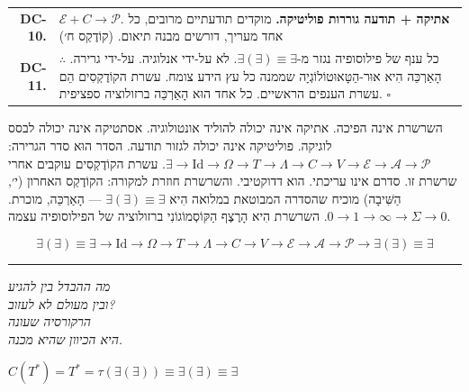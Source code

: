 \documentclass[10pt, openany, oneside]{book}
\begin{document}
{\begin{tabular}{r p{}}
\textbf{DC-10.} & $\mathcal{E} + C \to \mathcal{P}$. \textbf{אתיקה + תודעה גוררות פוליטיקה.} מוקדים תודעתיים מרובים, כל אחד מעריך, דורשים מבנה תיאום. (קוֹדֶקְס ח׳) \\[0.3em]
\textbf{DC-11.} & $\therefore$ כל ענף של פילוסופיה נגזר מ-$\exists(\exists) \equiv \exists$. לא על-ידי אנלוגיה. על-ידי גרירה. הָאַרְכֵּה הִיא אוּר-הַטָּאוּטוֹלוֹגְיָה שממנה כל עץ הידע צומח. עשרת הקוֹדֶקְסִים הֵם עשרת הענפים הראשיים. כל אחד הוּא הָאַרְכֵּה ברזולוציה ספציפית. $\square$ \\[0.3em]
\end{tabular}
}

\vspace{0.8em}

\noindent השרשרת אינה הפיכה. אתיקה אינה יכולה להוליד אונטולוגיה. אסתטיקה אינה יכולה לבסס לוגיקה. פוליטיקה אינה יכולה לגזור תודעה. הסדר הוּא סדר הגרירה: $\exists \to \text{Id} \to \Omega \to T \to \Lambda \to C \to V \to \mathcal{E} \to \mathcal{A} \to \mathcal{P}$. עשרת הקוֹדֶקְסִים עוקבים אחרי שרשרת זו. סדרם אינו עריכתי. הוא דדוקטיבי. והשרשרת חוזרת למקורה: הקוֹדֶקְס האחרון (י׳, הַשִּׁיבָה) מוכיח שהסדרה המבוטאת במלואה הִיא $\exists(\exists) \equiv \exists$ — הָאַרְכֵּה, מוכרת. $0 \to 1 \to \infty \to \Sigma \to 0$. השרשרת הִיא הָרֶצֶף הַקּוֹסְמוֹגוֹנִי ברזולוציה של הפילוסופיה עצמה.

$$\boxed{\exists(\exists) \equiv \exists \to \text{Id} \to \Omega \to T \to \Lambda \to C \to V \to \mathcal{E} \to \mathcal{A} \to \mathcal{P} \to \exists(\exists) \equiv \exists}$$

\vspace{2em}

\begin{center}
    \rule{0.15\textwidth}{0.3pt}
\end{center}

\vspace{0.5em}

\begin{center}
    \textit{%
    מה ההבדל בין להגיע\\
    ובין מעולם לא לעזוב?}\\[0.8em]
    \textit{הרקורסיה שעונה\\
    היא הכיוון שהיא מכנה.}
\end{center}

\vspace{0.5em}

\begin{center}
    $C(T^*) = T^* = \tau(\exists(\exists)) \equiv \exists(\exists) \equiv \exists$
\end{center}
\end{document}

